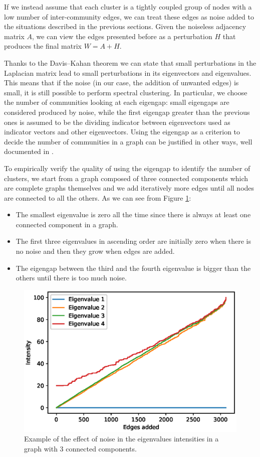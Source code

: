 \documentclass{article}
\begin{document}
If we instead assume that each cluster is a tightly coupled group of nodes
with a low number of inter-community edges, we can treat these edges as noise added
to the situations described in the previous sections.
Given the noiseless adjacency matrix $A$,
we can view the edges presented before as a perturbation $H$ that produces the final
matrix $W = A + H$.

Thanks to the Davis–Kahan theorem \cite{davis1970rotation} we can state that small perturbations
in the Laplacian matrix lead to small perturbations in its eigenvectors and eigenvalues.
This means that if the noise (in our case, the addition of unwanted edges) is small,
it is still possible to perform spectral clustering.
In particular, we choose the number of communities looking at each eigengap:
small eigengaps are considered produced by noise,
while the first eigengap greater than the previous ones is assumed to be the dividing
indicator between eigenvectors used as indicator vectors and other eigenvectors.
Using the eigengap as a criterion to decide the number of communities in a graph
can be justified in other ways, well documented in \cite{DBLP:journals/corr/abs-0711-0189}.

To empirically verify the quality of using the eigengap to identify the number of clusters,
we start from a graph composed of three connected components which are complete graphs themselves and
we add iteratively more edges until all nodes are connected to all the others.
As we can see from Figure \ref{figure:addingnoise}:
\begin{itemize}
    \item The smallest eigenvalue is zero all the time since there is always at least one connected component in a graph.
    \item The first three eigenvalues in ascending order are initially zero when there is no noise and then they grow when edges are added.
    \item The eigengap between the third and the fourth eigenvalue is bigger than the others until there is too much noise.
\end{itemize}

\begin{figure}[ht]
    \centering
    \includegraphics[width=0.5\linewidth]{figures/adding-noise.eps}
    \caption{Example of the effect of noise in the eigenvalues intensities in a graph with 3 connected components.}
    \label{figure:addingnoise}
\end{figure}
\end{document}
